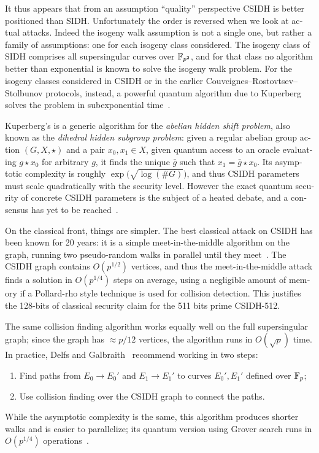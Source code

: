 \begin{otherlanguage}{english}
It thus appears that from an assumption ``quality'' perspective CSIDH
is better positioned than SIDH.  Unfortunately the order is reversed
when we look at actual attacks.  Indeed the isogeny walk assumption is
not a single one, but rather a family of assumptions: one for each
isogeny class considered. The isogeny class of SIDH comprises all
supersingular curves over $\mathbb{F}_{p^2}$, and for that class no algorithm
better than exponential is known to solve the isogeny walk problem.
For the isogeny classes considered in CSIDH or in the earlier
Couveignes--Rostovtsev--Stolbunov protocols, instead, a powerful
quantum algorithm due to Kuperberg solves the problem in
subexponential
time~\cite{regev04,Kup,Kuperberg2013,childs2014constructing}.

Kuperberg's is a generic algorithm for the \emph{abelian hidden shift
  problem}, also known as the \emph{dihedral hidden subgroup problem}:
given a regular abelian group action $(G,X,\star)$ and a pair
$x_0,x_1\in X$, given quantum access to an oracle evaluating
$g\star x_0$ for arbitrary $g$, it finds the unique $\bar{g}$ such
that $x_1=\bar{g}\star x_0$. Its asymptotic complexity is roughly
$\exp\bigl(\sqrt{\log(\#G)}\bigr)$, and thus CSIDH parameters must
scale quadratically with the security level.  However the exact
quantum security of concrete CSIDH parameters is the subject of a
heated debate, and a consensus has yet to be
reached~\cite{BIJ18,Jao-etal-kuperberg-2018,10.1007/978-3-030-17656-3_15,EC:BonSch20,EC:Peikert20,cryptoeprint:2020:1520}.

On the classical front, things are simpler. The best classical attack
on CSIDH has been known for 20 years: it is a simple
meet-in-the-middle algorithm on the graph, running two pseudo-random
walks in parallel until they
meet~\cite{Gal,EC:GalHesSma02,galbraith+stolbunov11,Delfs2016}.  The
CSIDH graph contains $O(p^{1/2})$ vertices, and thus the
meet-in-the-middle attack finds a solution in $O(p^{1/4})$ steps on
average, using a negligible amount of memory if a Pollard-rho style
technique is used for collision detection. This justifies the 128-bits
of classical security claim for the 511 bits prime CSIDH-512.

The same collision finding algorithm works equally well on the full
supersingular graph; since the graph has $\approx p/12$ vertices, the
algorithm runs in $O(\sqrt{p})$ time.  In practice, Delfs and
Galbraith~\cite{Delfs2016} recommend working in two steps:
\begin{enumerate}
\item Find paths from $E_0\to E_0'$ and $E_1\to E_1'$ to curves
  $E_0',E_1'$ defined over $\mathbb{F}_p$;
\item Use collision finding over the CSIDH graph to connect the paths.
\end{enumerate}
While the asymptotic complexity is the same, this algorithm produces
shorter walks and is easier to parallelize; its quantum version using
Grover search runs in $O(p^{1/4})$ operations~\cite{INDOCRYPT:BiaJaoSan14}.


\end{otherlanguage}
